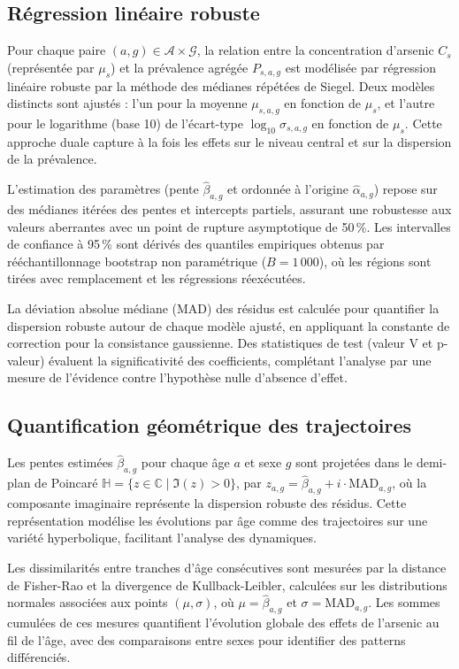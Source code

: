 \subsection{Régression linéaire robuste}
Pour chaque paire $(a, g) \in \mathcal{A} \times \mathcal{G}$, la relation entre la concentration d'arsenic $C_s$ (représentée par $\mu_s$) et la prévalence agrégée $P_{s,a,g}$ est modélisée par régression linéaire robuste par la méthode des médianes répétées de Siegel. Deux modèles distincts sont ajustés : l'un pour la moyenne $\mu_{s,a,g}$ en fonction de $\mu_s$, et l'autre pour le logarithme (base 10) de l'écart-type $\log_{10} \sigma_{s,a,g}$ en fonction de $\mu_s$. Cette approche duale capture à la fois les effets sur le niveau central et sur la dispersion de la prévalence.

L'estimation des paramètres (pente $\hat{\beta}_{a,g}$ et ordonnée à l'origine $\hat{\alpha}_{a,g}$) repose sur des médianes itérées des pentes et intercepts partiels, assurant une robustesse aux valeurs aberrantes avec un point de rupture asymptotique de 50\,\%. Les intervalles de confiance à 95\,\% sont dérivés des quantiles empiriques obtenus par rééchantillonnage bootstrap non paramétrique ($B = 1\,000$), où les régions sont tirées avec remplacement et les régressions réexécutées.

La déviation absolue médiane (MAD) des résidus est calculée pour quantifier la dispersion robuste autour de chaque modèle ajusté, en appliquant la constante de correction pour la consistance gaussienne. Des statistiques de test (valeur V et p-valeur) évaluent la significativité des coefficients, complétant l'analyse par une mesure de l'évidence contre l'hypothèse nulle d'absence d'effet.

\subsection{Quantification géométrique des trajectoires}
Les pentes estimées $\hat{\beta}_{a,g}$ pour chaque âge $a$ et sexe $g$ sont projetées dans le demi-plan de Poincaré $\mathbb{H} = \{ z \in \mathbb{C} \mid \Im(z) > 0 \}$, par $z_{a,g} = \hat{\beta}_{a,g} + i \cdot \mathrm{MAD}_{a,g}$, où la composante imaginaire représente la dispersion robuste des résidus. Cette représentation modélise les évolutions par âge comme des trajectoires sur une variété hyperbolique, facilitant l'analyse des dynamiques.

Les dissimilarités entre tranches d'âge consécutives sont mesurées par la distance de Fisher-Rao et la divergence de Kullback-Leibler, calculées sur les distributions normales associées aux points $(\mu, \sigma)$, où $\mu = \hat{\beta}_{a,g}$ et $\sigma = \mathrm{MAD}_{a,g}$. Les sommes cumulées de ces mesures quantifient l'évolution globale des effets de l'arsenic au fil de l'âge, avec des comparaisons entre sexes pour identifier des patterns différenciés.

